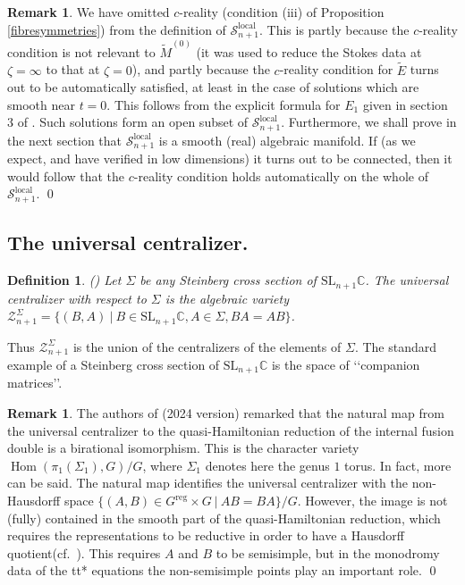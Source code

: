 \documentclass[a4paper,12pt,leqno]{amsart}
\numberwithin{equation}{section}
\theoremstyle{plain}
\newtheorem{definition}[theorem]{Definition}
\theoremstyle{definition}
\newtheorem{remark}[theorem]{Remark}
\newcommand{\C}{\mathbb C}
\newcommand{\ze}{\zeta}
\DeclareMathOperator{\Hom}{Hom}
\newcommand{\SL}{\textrm{SL}}
\newcommand{\cS}{\mathcal{S}}
\newcommand{\cZ}{\mathcal{Z}}
\newcommand{\st}{\ \vert\ }
\renewcommand{\ll}{\lq\lq}
\newcommand{\rrr}{\rq\rq}
\newcommand{\tE}{  \tilde E  }
\newcommand{\tMz}{  \tilde M^{(0)}  }
\newcommand{\reg}{\mathrm{reg}}
\begin{document}
\begin{remark}\label{remarkX.2}
We have omitted $c$-reality (condition (iii) of Proposition \ref{fibresymmetries})
from the definition of $\cS_{n+1}^{\text{local}}$.
This is partly because the $c$-reality condition is not relevant to $\tMz$ (it was used
to reduce the Stokes data at $\ze=\infty$ to that at $\zeta=0$), and partly because the
$c$-reality condition for $\tE$ turns out to be automatically satisfied, at least in the case of solutions which are smooth near $t=0$.
This follows from the explicit formula for $E_1$ given in section 3 of \cite{GILX}.
Such solutions
form an open subset of $\cS_{n+1}^{\text{local}}$.
Furthermore, we shall prove in the next section that $\cS_{n+1}^{\text{local}}$ is a smooth
(real) algebraic manifold. If (as we expect, and have verified in low dimensions) it turns
out to be connected, then it would follow 
that the $c$-reality condition holds automatically on the whole of $\cS_{n+1}^{\text{local}}$.
\qed
\end{remark}

\subsection{The universal centralizer.}\label{uc}

\begin{definition}\label{ucdef} (\cite{Lu76}) Let $\Sigma$ be any Steinberg cross section of
$\SL_{n+1}\C$.
The universal centralizer with respect to $\Sigma$ is the algebraic variety
$
\cZ_{n+1}^\Sigma=
\{ (B,A) \st
B\in  \SL_{n+1}\C,
A\in\Sigma,
BA=AB
\}
$.
\end{definition}

Thus  $\cZ_{n+1}^\Sigma$ is the union of the centralizers of the elements
of $\Sigma$.
The standard example of  a Steinberg cross section of $\SL_{n+1}\C$ is
the space of \ll companion matrices\rrr.

\begin{remark}\label{remarkX.X} The authors of \cite{BFM} (2024 version)
remarked that the natural map from the universal centralizer to the quasi-Hamiltonian reduction of the internal fusion double is a birational isomorphism. 
This is the character variety $\Hom(\pi_1(\Sigma_1),G)/G$, where $\Sigma_1$ denotes here the genus $1$ torus. 
In fact, more can be said. The natural map identifies the universal centralizer with the non-Hausdorff space $\{ (A,B)\in G^\reg\times G ~|~AB=BA\}/G$. 
However, the image is not (fully) contained in the smooth part of the quasi-Hamiltonian reduction, which requires the representations to be reductive in order to have a Hausdorff quotient(cf.\ \cite{Go84}). This requires  $A$ and $B$ to be semisimple, but in the monodromy data of the tt* equations the non-semisimple points play an important role.
\qed
\end{remark}
\end{document}
